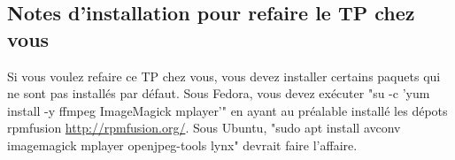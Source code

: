 \subsection{Notes d'installation pour refaire le TP chez vous}

Si vous voulez refaire ce TP chez vous, vous devez installer certains paquets qui ne sont pas installés par défaut. Sous Fedora, vous devez exécuter "su -c 'yum install -y ffmpeg ImageMagick mplayer'" en ayant au préalable installé les dépots rpmfusion \url{http://rpmfusion.org/}. Sous Ubuntu, "sudo apt install avconv imagemagick mplayer openjpeg-tools lynx" devrait faire l'affaire.


\vfill
\newpage
